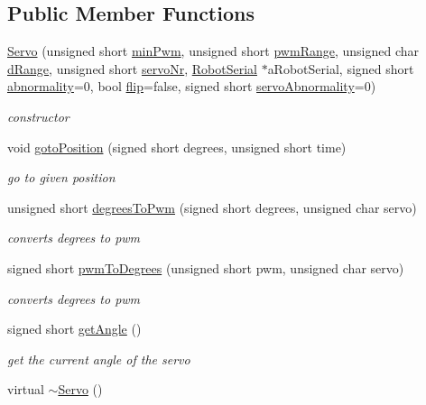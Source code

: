 \subsection*{Public Member Functions}
\begin{DoxyCompactItemize}
\item 
\hyperlink{struct_servo_ab662ab5df0c5f665e7eb11508c39f1a7}{Servo} (unsigned short \hyperlink{struct_servo_a209ccc691c719c1442f77a0c0ee08fbb}{min\+Pwm}, unsigned short \hyperlink{struct_servo_ad3b5b2cb998a334baeb520cecc24be48}{pwm\+Range}, unsigned char \hyperlink{struct_servo_a534d23b4cf1dcdd677dfa503101c50a0}{d\+Range}, unsigned short \hyperlink{struct_servo_a0795bd3f3c8d44e1818ffd653a7484d5}{servo\+Nr}, \hyperlink{class_robot_serial}{Robot\+Serial} $\ast$a\+Robot\+Serial, signed short \hyperlink{struct_servo_a65a5e86b2f31ec2a9c115e818a1ea703}{abnormality}=0, bool \hyperlink{struct_servo_a4b94c914128a9965e264f0be608fb6a7}{flip}=false, signed short \hyperlink{struct_servo_a0876d7d53f6e32cd75fa8ead3c274ead}{servo\+Abnormality}=0)
\begin{DoxyCompactList}\small\item\em constructor \end{DoxyCompactList}\item 
void \hyperlink{struct_servo_aed94c74351c407e550a51ba40215c135}{goto\+Position} (signed short degrees, unsigned short time)
\begin{DoxyCompactList}\small\item\em go to given position \end{DoxyCompactList}\item 
unsigned short \hyperlink{struct_servo_a0cfd9bbddac8bb91017569e0812f816a}{degrees\+To\+Pwm} (signed short degrees, unsigned char servo)
\begin{DoxyCompactList}\small\item\em converts degrees to pwm \end{DoxyCompactList}\item 
signed short \hyperlink{struct_servo_a293b3a36b2ab449f83d2c1152a6c5115}{pwm\+To\+Degrees} (unsigned short pwm, unsigned char servo)
\begin{DoxyCompactList}\small\item\em converts degrees to pwm \end{DoxyCompactList}\item 
signed short \hyperlink{struct_servo_af8a34733daf26ac3fe4bc6002931b7a8}{get\+Angle} ()
\begin{DoxyCompactList}\small\item\em get the current angle of the servo \end{DoxyCompactList}\item 
virtual \hyperlink{struct_servo_acb51bf4d970b071741ba76349a431fb0}{$\sim$\+Servo} ()
\end{DoxyCompactItemize}
